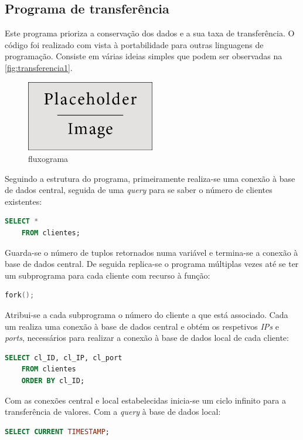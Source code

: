 \documentclass[11pt,twoside,a4paper]{report}
\begin{document}
\subsection{Programa de transferência}
Este programa prioriza a conservação dos dados e a sua taxa de transferência. O código foi realizado com vista à portabilidade para outras linguagens de programação. Consiste em várias ideias simples que podem ser observadas na \autoref{fig:transferencia1}.
\begin{figure}[H]
	\begin{center}
		\includegraphics[width=0.5\textwidth]{placeholder} %
		\caption{fluxograma}
		\label{fig:transferencia1}
	\end{center}
\end{figure}
Seguindo a estrutura do programa, primeiramente realiza-se uma conexão à base de dados central, seguida de uma \textit{query} para se saber o número de clientes existentes:
\begin{lstlisting}[language = SQL]
	SELECT *
	FROM clientes;
\end{lstlisting}
Guarda-se o número de tuplos retornados numa variável e termina-se a conexão à base de dados central. De seguida replica-se o programa múltiplas vezes até se ter um subprograma para cada cliente com recurso à função:
\begin{lstlisting}[language = C]
	fork();
\end{lstlisting}
Atribui-se a cada subprograma o número do cliente a que está associado. Cada um realiza uma conexão à base de dados central e obtém os respetivos \textit{IPs} e \textit{ports}, necessários para realizar a conexão à base de dados local de cada cliente:
\begin{lstlisting}[language = SQL]
	SELECT cl_ID, cl_IP, cl_port
	FROM clientes
	ORDER BY cl_ID;
\end{lstlisting}
Com as conexões central e local estabelecidas inicia-se um ciclo infinito para a transferência de valores. Com a \textit{query} à base de dados local:
\begin{lstlisting}[language = SQL]
	SELECT CURRENT TIMESTAMP;
\end{lstlisting}
\end{document}
